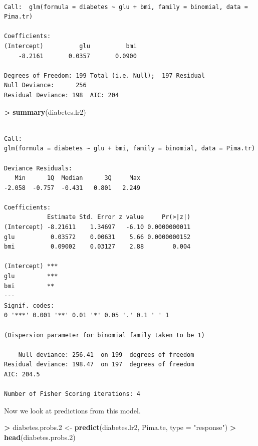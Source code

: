 \documentclass[]{krantz}
\makeatletter
\newenvironment{Shaded}{\begin{snugshade}}{\end{snugshade}}
\newcommand{\KeywordTok}[1]{\textcolor[rgb]{0.27,0.27,0.27}{\textbf{#1}}}
\newcommand{\DataTypeTok}[1]{\textcolor[rgb]{0.27,0.27,0.27}{#1}}
\newcommand{\DecValTok}[1]{\textcolor[rgb]{0.06,0.06,0.06}{#1}}
\newcommand{\StringTok}[1]{\textcolor[rgb]{0.5,0.5,0.5}{#1}}
\newcommand{\OperatorTok}[1]{\textcolor[rgb]{0.43,0.43,0.43}{\textbf{#1}}}
\newcommand{\NormalTok}[1]{#1}
\newenvironment{kframe}{%
\medskip{}
\setlength{\fboxsep}{.8em}
 \def\at@end@of@kframe{}%
 \ifinner\ifhmode%
  \def\at@end@of@kframe{\end{minipage}}%
  \begin{minipage}{\columnwidth}%
 \fi\fi%
 \def\FrameCommand##1{\hskip\@totalleftmargin \hskip-\fboxsep
 \colorbox{shadecolor}{##1}\hskip-\fboxsep
     \hskip-\linewidth \hskip-\@totalleftmargin \hskip\columnwidth}%
 \MakeFramed {\advance\hsize-\width
   \@totalleftmargin\z@ \linewidth\hsize
   \@setminipage}}%
 {\par\unskip\endMakeFramed%
 \at@end@of@kframe}
\renewenvironment{Shaded}{\begin{kframe}}{\end{kframe}}
\makeatother
\begin{document}
\begin{verbatim}

Call:  glm(formula = diabetes ~ glu + bmi, family = binomial, data = Pima.tr)

Coefficients:
(Intercept)          glu          bmi  
    -8.2161       0.0357       0.0900  

Degrees of Freedom: 199 Total (i.e. Null);  197 Residual
Null Deviance:      256 
Residual Deviance: 198  AIC: 204
\end{verbatim}

\begin{Shaded}
\begin{Highlighting}[]
\OperatorTok{>}\StringTok{ }\KeywordTok{summary}\NormalTok{(diabetes.lr2)}
\end{Highlighting}
\end{Shaded}

\begin{verbatim}

Call:
glm(formula = diabetes ~ glu + bmi, family = binomial, data = Pima.tr)

Deviance Residuals: 
   Min      1Q  Median      3Q     Max  
-2.058  -0.757  -0.431   0.801   2.249  

Coefficients:
            Estimate Std. Error z value     Pr(>|z|)
(Intercept) -8.21611    1.34697   -6.10 0.0000000011
glu          0.03572    0.00631    5.66 0.0000000152
bmi          0.09002    0.03127    2.88        0.004
               
(Intercept) ***
glu         ***
bmi         ** 
---
Signif. codes:  
0 '***' 0.001 '**' 0.01 '*' 0.05 '.' 0.1 ' ' 1

(Dispersion parameter for binomial family taken to be 1)

    Null deviance: 256.41  on 199  degrees of freedom
Residual deviance: 198.47  on 197  degrees of freedom
AIC: 204.5

Number of Fisher Scoring iterations: 4
\end{verbatim}

Now we look at predictions from this model.

\begin{Shaded}
\begin{Highlighting}[]
\OperatorTok{>}\StringTok{ }\NormalTok{diabetes.probs.}\DecValTok{2}\NormalTok{ <-}\StringTok{ }\KeywordTok{predict}\NormalTok{(diabetes.lr2, Pima.te, }\DataTypeTok{type =} \StringTok{"response"}\NormalTok{)}
\OperatorTok{>}\StringTok{ }\KeywordTok{head}\NormalTok{(diabetes.probs.}\DecValTok{2}\NormalTok{)}
\end{Highlighting}
\end{Shaded}
\end{document}
